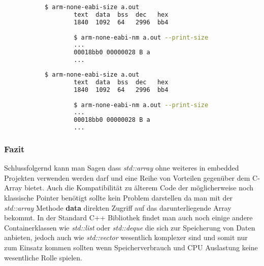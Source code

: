 \documentclass[MES,Master,ngerman]{twbook}%
\begin{document}
\begin{figure}[!htb]
	\begin{subfigure}[b]{0.5\textwidth}
		\begin{lstlisting}[gobble=6, title={C- Array}, language=bash, numbers=none]
		$ arm-none-eabi-size a.out
		text  data  bss  dec   hex
		1840  1092  64   2996  bb4
		
		$ arm-none-eabi-nm a.out --print-size
		...
		00018bb0 00000028 B a
		...
		\end{lstlisting}
	\end{subfigure}
	\begin{subfigure}[b]{0.5\textwidth}
		\begin{lstlisting}[gobble=6, title={std::array}, language=bash, numbers=none]
		$ arm-none-eabi-size a.out
		text  data  bss  dec   hex
		1840  1092  64   2996  bb4
		
		$ arm-none-eabi-nm a.out --print-size
		...
		00018bb0 00000028 B a
		...
		\end{lstlisting}
	\end{subfigure}
\end{figure}

\subsubsection{Fazit}
Schlussfolgernd kann man Sagen dass \textit{std::array} ohne weiteres in embedded Projekten verwenden werden darf und eine Reihe von Vorteilen gegenüber dem C- Array bietet. Auch die Kompatibilität zu älterem Code der möglicherweise noch klassische Pointer benötigt sollte kein Problem darstellen da man mit der \textit{std::array} Methode \textbf{data} direkten Zugriff auf das darunterliegende Array bekommt. In der Standard C++ Bibliothek findet man auch noch einige andere Containerklassen wie \textit{std::list} oder \textit{std::deque} die sich zur Speicherung von Daten anbieten, jedoch auch wie \textit{std::vector} wesentlich komplexer sind und somit nur zum Einsatz kommen sollten wenn Speicherverbrauch und CPU Auslastung keine wesentliche Rolle spielen.
\newpage
\end{document}
